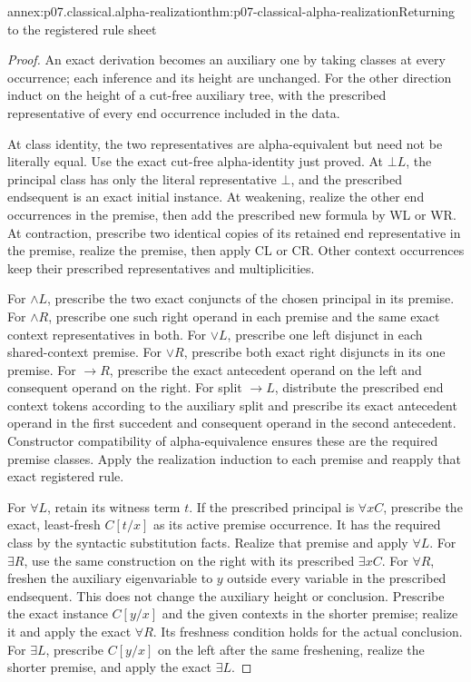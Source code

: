 \begin{annexitem}{annex:p07.classical.alpha-realization}{thm:p07-classical-alpha-realization}{Returning to the registered rule sheet}
\begin{proof}
An exact derivation becomes an auxiliary one by taking classes at every
occurrence; each inference and its height are unchanged. For the other
direction induct on the height of a cut-free auxiliary tree, with the
prescribed representative of every end occurrence included in the data.

At class identity, the two representatives are alpha-equivalent but need
not be literally equal. Use the exact cut-free alpha-identity just proved.
At \(\bot L\), the principal class has only the literal representative
\(\bot\), and the prescribed endsequent is an exact initial instance.
At weakening, realize the other end occurrences in the premise, then add
the prescribed new formula by WL or WR. At contraction, prescribe two
identical copies of its retained end representative in the premise,
realize the premise, then apply CL or CR. Other context occurrences keep
their prescribed representatives and multiplicities.

For \(\land L\), prescribe the two exact conjuncts of the chosen
principal in its premise. For \(\land R\), prescribe one such right
operand in each premise and the same exact context representatives in
both. For \(\lor L\), prescribe one left disjunct in each shared-context
premise. For \(\lor R\), prescribe both exact right disjuncts in its one
premise. For \(\to R\), prescribe the exact antecedent operand on the
left and consequent operand on the right. For split \(\to L\),
distribute the prescribed end context tokens according to the auxiliary
split and prescribe its exact antecedent operand in the first succedent
and consequent operand in the second antecedent. Constructor compatibility
of alpha-equivalence ensures these are the required premise classes.
Apply the realization induction to each premise and reapply that exact
registered rule.

For \(\forall L\), retain its witness term \(t\). If the prescribed
principal is \(\forall xC\), prescribe the exact, least-fresh
\(C[t/x]\) as its active premise occurrence. It has the required class
by the syntactic substitution facts. Realize that premise and apply
\(\forall L\). For \(\exists R\), use the same construction on the
right with its prescribed \(\exists xC\).
For \(\forall R\), freshen the auxiliary eigenvariable to \(y\)
outside every variable in the prescribed endsequent. This does not
change the auxiliary height or conclusion. Prescribe the exact instance
\(C[y/x]\) and the given contexts in the shorter premise; realize it
and apply the exact \(\forall R\). Its freshness condition holds for
the actual conclusion. For \(\exists L\), prescribe \(C[y/x]\) on
the left after the same freshening, realize the shorter premise, and
apply the exact \(\exists L\).


\end{proof}
\end{annexitem}
